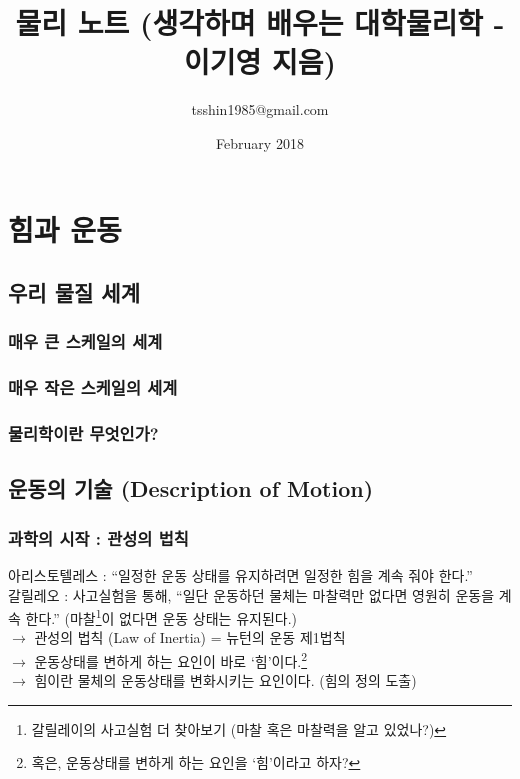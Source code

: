\documentclass[10pt,a4paper]{report}
\title{물리 노트 (생각하며 배우는 대학물리학 - 이기영 지음)}
\author{tsshin1985@gmail.com}
\date{February 2018}
\begin{document}
	
	\maketitle
	
	\part{힘과 운동}
	
	\chapter{우리 물질 세계}
	
	\section{매우 큰 스케일의 세계}
	
	\section{매우 작은 스케일의 세계}
	
	\section{물리학이란 무엇인가?}
	
	\chapter{운동의 기술 (Description of Motion)}
	
	\section{과학의 시작 : 관성의 법칙}
	
	아리스토텔레스 : ``일정한 운동 상태를 유지하려면 일정한 힘을 계속 줘야 한다.''\\
	갈릴레오 : 사고실험을 통해, ``일단 운동하던 물체는 마찰력만 없다면 영원히 운동을 계속 한다.''
	(마찰\footnote{갈릴레이의 사고실험 더 찾아보기 (마찰 혹은 마찰력을 알고 있었나?)}이 없다면 운동 상태는 유지된다.)\\
	$\rightarrow$ 관성의 법칙 (Law of Inertia) = 뉴턴의 운동 제1법칙\\
	$\rightarrow$ 운동상태를 변하게 하는 요인이 바로 `힘'이다.\footnote{혹은, 운동상태를 변하게 하는 요인을 `힘'이라고 하자?}\\
	$\rightarrow$ 힘이란 물체의 운동상태를 변화시키는 요인이다. (힘의 정의 도출)\par
	
\end{document}
